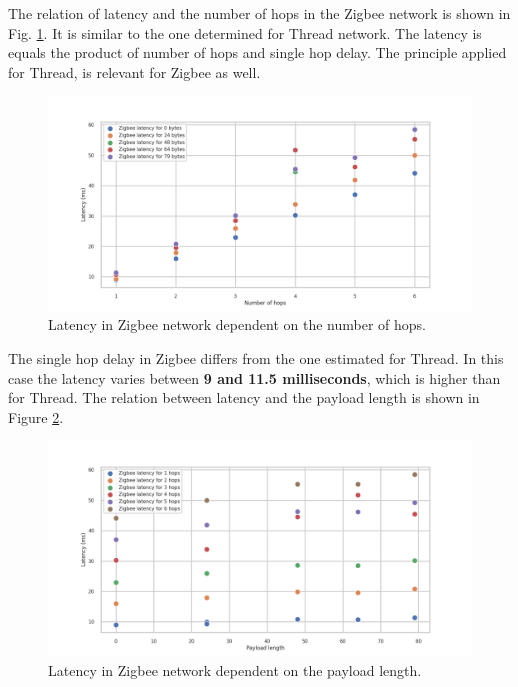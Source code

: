 The relation of latency and the number of hops in the Zigbee network is shown in Fig. 
\ref{fig:zigbee_latency_all}. It is similar to the one determined 
for Thread network. The latency is equals the product of number of
hops and single hop delay. The principle applied for Thread,
is relevant for Zigbee as well.


\begin{figure}[H]
    \centering
    \includegraphics[scale=0.45]{images/Zigbee_Latency_all.png}
    \caption{Latency in Zigbee network dependent on the number of hops.}
    \label{fig:zigbee_latency_all}
\end{figure}

The single hop delay in Zigbee differs from the one estimated for 
Thread. In this case the latency varies between \textbf{9 and 11.5 milliseconds}, which is higher than for Thread. The relation between
latency and the payload length is shown in 
Figure \ref{fig:zigbee_latency_length}.

\begin{figure}[H]
    \centering
    \includegraphics[scale=0.45]{images/Zigbee_Latency_vs_length.png}
    \caption{Latency in Zigbee network dependent on the payload length. }
    \label{fig:zigbee_latency_length}
\end{figure}

